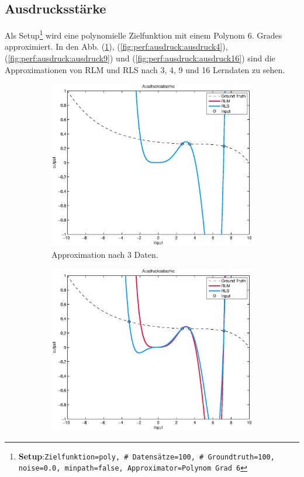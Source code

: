 \documentclass[a4paper, 12pt]{article}
\begin{document}
{\subsection{Ausdrucksstärke}
\label{sec:perf:ausdruck}
Als Setup\footnote{\textbf{Setup}:\quad\texttt{Zielfunktion=poly, \# Datensätze=100, \# Groundtruth=100, noise=0.0, minpath=false, Approximator=Polynom Grad 6}} wird eine polynomielle Zielfunktion mit einem Polynom 6. Grades approximiert.
In den Abb. (\ref{fig:perf:ausdruck:ausdruck3}), (\ref{fig:perf:ausdruck:ausdruck4}), (\ref{fig:perf:ausdruck:ausdruck9}) und (\ref{fig:perf:ausdruck:ausdruck16}) sind die Approximationen von RLM und RLS nach 3, 4, 9 und 16 Lerndaten zu sehen.
\begin{figure}[H]
  \centering
  \begin{subfigure}[b]{0.4\textwidth}
    \centering
    \includegraphics[width=\textwidth]{./images/copyofstats/ausdruck6_approx_piece_3.eps}
    \caption{Approximation nach 3 Daten.}
    \label{fig:perf:ausdruck:ausdruck3}
  \end{subfigure}
  \begin{subfigure}[b]{0.4\textwidth}
    \centering
    \includegraphics[width=\textwidth]{./images/copyofstats/ausdruck6_approx_piece_4.eps}

\end{subfigure}
\end{figure}}
\end{document}
